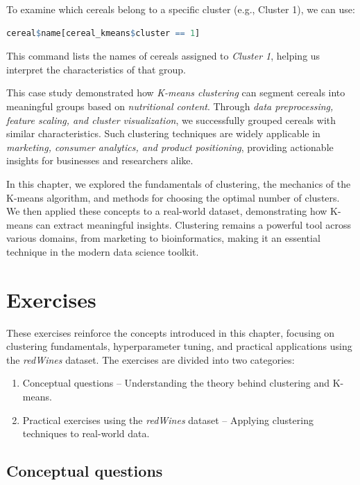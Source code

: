 \documentclass[
]{book}
\providecommand{\tightlist}{%
  \setlength{\itemsep}{0pt}\setlength{\parskip}{0pt}}
\theoremstyle{definition}
\theoremstyle{definition}
\theoremstyle{definition}
\theoremstyle{definition}
\theoremstyle{remark}
\begin{document}
To examine which cereals belong to a specific cluster (e.g., Cluster 1), we can use:

\begin{lstlisting}[language=R]
cereal$name[cereal_kmeans$cluster == 1]
\end{lstlisting}

This command lists the names of cereals assigned to \emph{Cluster 1}, helping us interpret the characteristics of that group.

This case study demonstrated how \emph{K-means clustering} can segment cereals into meaningful groups based on \emph{nutritional content}. Through \emph{data preprocessing, feature scaling, and cluster visualization}, we successfully grouped cereals with similar characteristics. Such clustering techniques are widely applicable in \emph{marketing, consumer analytics, and product positioning}, providing actionable insights for businesses and researchers alike.

In this chapter, we explored the fundamentals of clustering, the mechanics of the K-means algorithm, and methods for choosing the optimal number of clusters. We then applied these concepts to a real-world dataset, demonstrating how K-means can extract meaningful insights. Clustering remains a powerful tool across various domains, from marketing to bioinformatics, making it an essential technique in the modern data science toolkit.

\section*{Exercises}\label{exercises-9}

These exercises reinforce the concepts introduced in this chapter, focusing on clustering fundamentals, hyperparameter tuning, and practical applications using the \emph{redWines} dataset. The exercises are divided into two categories:

\begin{enumerate}
\def\labelenumi{\arabic{enumi}.}
\tightlist
\item
  Conceptual questions -- Understanding the theory behind clustering and K-means.\\
\item
  Practical exercises using the \emph{redWines} dataset -- Applying clustering techniques to real-world data.
\end{enumerate}

\subsection*{Conceptual questions}\label{conceptual-questions-11}
\end{document}
